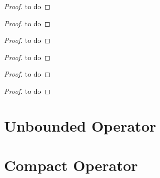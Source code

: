 \begin{theorem}
\end{theorem}

\begin{proof}
to do
\end{proof}

\begin{theorem}
\end{theorem}

\begin{proof}
to do
\end{proof}

\begin{theorem}
\end{theorem}

\begin{proof}
to do
\end{proof}

\begin{theorem}
\end{theorem}

\begin{proof}
to do
\end{proof}

\begin{theorem}[等价范数定理]
\end{theorem}

\begin{proof}
to do
\end{proof}

\begin{definition}
\end{definition}

\begin{theorem}
\end{theorem}

\begin{proof}
to do
\end{proof}

\section{Unbounded Operator}

\section{Compact Operator}

\begin{definition}
\end{definition}

